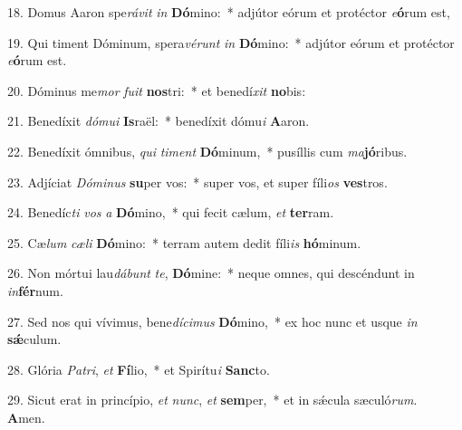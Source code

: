 18. Domus Aaron spe\textit{rá}\textit{vit} \textit{in} \textbf{Dó}mino:~*  adjútor eórum et protéctor \textit{e}\textbf{ó}rum est,\

19. Qui timent Dóminum, spera\textit{vé}\textit{runt} \textit{in} \textbf{Dó}mino:~*  adjútor eórum et protéctor \textit{e}\textbf{ó}rum est.\

20. Dóminus me\textit{mor} \textit{fu}\textit{it} \textbf{nos}tri:~*  et benedí\textit{xit} \textbf{no}bis:\

21. Benedíxit \textit{dó}\textit{mu}\textit{i} \textbf{Is}raël:~*  benedíxit dómu\textit{i} \textbf{A}aron.\

22. Benedíxit ómnibus, \textit{qui} \textit{ti}\textit{ment} \textbf{Dó}minum,~*  pusíllis cum \textit{ma}\textbf{jó}ribus.\

23. Adjíciat \textit{Dó}\textit{mi}\textit{nus} \textbf{su}per vos:~*  super vos, et super fíli\textit{os} \textbf{ves}tros.\

24. Benedíc\textit{ti} \textit{vos} \textit{a} \textbf{Dó}mino,~*  qui fecit cælum, \textit{et} \textbf{ter}ram.\

25. Cæ\textit{lum} \textit{cæ}\textit{li} \textbf{Dó}mino:~*  terram autem dedit fíli\textit{is} \textbf{hó}minum.\

26. Non mórtui lau\textit{dá}\textit{bunt} \textit{te}, \textbf{Dó}mine:~*  neque omnes, qui descéndunt in \textit{in}\textbf{fér}num.\

27. Sed nos qui vívimus, bene\textit{dí}\textit{ci}\textit{mus} \textbf{Dó}mino,~*  ex hoc nunc et usque \textit{in} \textbf{sǽ}culum.\

28. Glória \textit{Pa}\textit{tri}, \textit{et} \textbf{Fí}lio,~*  et Spirítu\textit{i} \textbf{Sanc}to.\

29. Sicut erat in princípio, \textit{et} \textit{nunc}, \textit{et} \textbf{sem}per,~*  et in sǽcula sæculó\textit{rum}. \textbf{A}men.\

